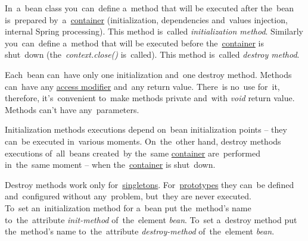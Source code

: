 In~a~bean class you~can~define a~method that will be executed after the~bean is~prepared by~a~\hyperref[springcontainrer]{container} (initialization, dependencies and~values injection, internal Spring processing).
This method is~called \textit{initialization method}.
Similarly you~can~define a~method that will be executed before the~\hyperref[springcontainrer]{container} is shut~down (the~\textit{context.close()} is~called).
This method is~called \textit{destroy method}.

Each~bean can~have only one initialization and~one destroy method.
Methods can~have any \hyperref[javaaccessmodifiers]{access modifier} and~any return value.
There~is no~use for~it, therefore, it's~convenient to~make methods private and~with \textit{void} return value.
Methods can't have any~parameters.

Initialization methods executions depend on~bean initialization points -- they can~be executed in~various moments.
On~the~other hand, destroy methods executions of~all~beans created~by the~same \hyperref[springcontainrer]{container} are~performed in~the~same moment -- when the~\hyperref[springcontainrer]{container} is shut~down.

\warning Destroy methods work only for~\hyperref[singletondp]{singletons}.
For~\hyperref[prototypedp]{prototypes} they can~be defined and~configured without any~problem, but~they are never executed.\\

\noindent To~set an~initialization method for a~bean put the~method's name to~the~attribute \textit{init-method} of~the~element \textit{bean}.
To~set a~destroy method put the~method's name to~the~attribute \textit{destroy-method} of~the~element \textit{bean}.
\newpage

